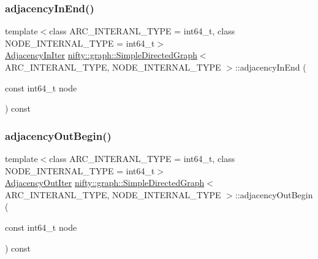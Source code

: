 \subsubsection{\texorpdfstring{adjacency\+In\+End()}{adjacencyInEnd()}}
{\footnotesize\ttfamily template$<$class A\+R\+C\+\_\+\+I\+N\+T\+E\+R\+A\+N\+L\+\_\+\+T\+Y\+PE  = int64\+\_\+t, class N\+O\+D\+E\+\_\+\+I\+N\+T\+E\+R\+N\+A\+L\+\_\+\+T\+Y\+PE  = int64\+\_\+t$>$ \\
\hyperlink{classnifty_1_1graph_1_1SimpleDirectedGraph_aaf7f58391a2b6e0db7983462dbd6a542}{Adjacency\+In\+Iter} \hyperlink{classnifty_1_1graph_1_1SimpleDirectedGraph}{nifty\+::graph\+::\+Simple\+Directed\+Graph}$<$ A\+R\+C\+\_\+\+I\+N\+T\+E\+R\+A\+N\+L\+\_\+\+T\+Y\+PE, N\+O\+D\+E\+\_\+\+I\+N\+T\+E\+R\+N\+A\+L\+\_\+\+T\+Y\+PE $>$\+::adjacency\+In\+End (\begin{DoxyParamCaption}\item[{const int64\+\_\+t}]{node }\end{DoxyParamCaption}) const\hspace{0.3cm}{\ttfamily [inline]}}

\mbox{\label{classnifty_1_1graph_1_1SimpleDirectedGraph_a9fbdb0d5e280140eb11bd384b2985e2c}} 
\subsubsection{\texorpdfstring{adjacency\+Out\+Begin()}{adjacencyOutBegin()}}
{\footnotesize\ttfamily template$<$class A\+R\+C\+\_\+\+I\+N\+T\+E\+R\+A\+N\+L\+\_\+\+T\+Y\+PE  = int64\+\_\+t, class N\+O\+D\+E\+\_\+\+I\+N\+T\+E\+R\+N\+A\+L\+\_\+\+T\+Y\+PE  = int64\+\_\+t$>$ \\
\hyperlink{classnifty_1_1graph_1_1SimpleDirectedGraph_a5af7a4eb6bbc44b805a44bb131786dd0}{Adjacency\+Out\+Iter} \hyperlink{classnifty_1_1graph_1_1SimpleDirectedGraph}{nifty\+::graph\+::\+Simple\+Directed\+Graph}$<$ A\+R\+C\+\_\+\+I\+N\+T\+E\+R\+A\+N\+L\+\_\+\+T\+Y\+PE, N\+O\+D\+E\+\_\+\+I\+N\+T\+E\+R\+N\+A\+L\+\_\+\+T\+Y\+PE $>$\+::adjacency\+Out\+Begin (\begin{DoxyParamCaption}\item[{const int64\+\_\+t}]{node }\end{DoxyParamCaption}) const\hspace{0.3cm}{\ttfamily [inline]}}

